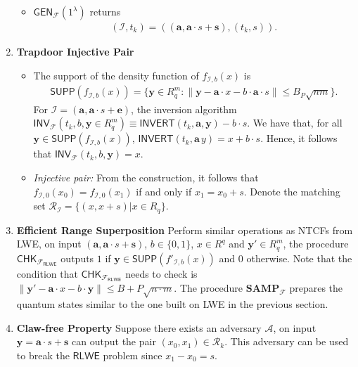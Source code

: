 \begin{defn}
\begin{enumerate}
\begin{itemize}
        \item $\mathsf{GEN}_{\mathcal{F}}(1^{\lambda})$ returns \begin{align}
            (\mathcal{I},t_k)=((\mathbf{a},\mathbf{a}\cdot s+\mathbf{s}),(t_{k},s)).
        \end{align}
        \end{itemize}
    \item \textbf{Trapdoor Injective Pair}
        \begin{itemize}
        \item The support of the density function of $f_{\mathcal{I},b}(x)$ is 
        \begin{align}
            \mathsf{SUPP}(f_{\mathcal{I},b}(x))=\{\mathbf{y}\in R_q^m:\|\mathbf{y}- \mathbf{a} \cdot x-b\cdot \mathbf{a} \cdot s\|\leq B_P\sqrt{nm}\}.
        \end{align}
        For $\mathcal{I}=(\mathbf{a},\mathbf{a}\cdot s+\mathbf{e})$, the inversion algorithm $\mathsf{INV}_\mathcal{F}(t_{k},b,\mathbf{y}\in R_q^m) \equiv \mathsf{INVERT}(t_{k},\mathbf{a},\mathbf{y})-b\cdot s$. We have that, for all $\mathbf{y}\in \mathsf{SUPP}(f_{\mathcal{I},b}(x))$, $\mathsf{INVERT}(t_{k},\mathbf{a}\,y)=x+b\cdot s$. Hence, it follows that $\mathsf{INV}_\mathcal{F}(t_{k},b,\mathbf{y})= x$.
        
        \item \textit{Injective pair:} From the construction, it follows that $f_{\mathcal{I},0}(x_0)= f_{\mathcal{I},0}(x_1)$ if and only if $x_1=x_0+s$. Denote the matching set $\mathcal{R}_{\mathcal{I}}=\{(x,x+s)|x\in R_q\}$.
    \end{itemize}
    \item \textbf{Efficient Range Superposition}
    Perform similar operations as NTCFs from LWE, on input $(\mathbf{a},\mathbf{a}\cdot s+\mathbf{s})$, $b\in\{0,1\}$, $x\in R^q$ and $\mathbf{y}'\in R^m_q$, the procedure $\mathsf{CHK}_{\mathcal{F}_{\mathsf{RLWE}}}$ outputs $1$ if $\mathbf{y}\in\mathsf{SUPP}(f'_{\mathcal{I},b}(x))$ and $0$ otherwise.
    Note that the condition that $\mathsf{CHK}_{\mathcal{F}_{\mathsf{RLWE}}}$ needs to check is $\|\mathbf{y}'-\mathbf{a}\cdot x - b\cdot \mathbf{y}\|\leq B+P\sqrt{n\cdot m}$.
    The procedure $\mathbf{SAMP}_{\mathcal{F}}$ prepares the quantum states similar to the one built on LWE in the previous section.
     
    \item \textbf{Claw-free Property} Suppose there exists an adversary $\mathcal{A}$, on input $\mathbf{y}=\mathbf{a}\cdot s+\mathbf{s}$ can output the pair $(x_0,x_1)\in\mathcal{R}_k$. This adversary can be used to break the $\mathsf{RLWE}$ problem since $x_1-x_0=s$.  
        
    \end{enumerate}
\end{defn}

